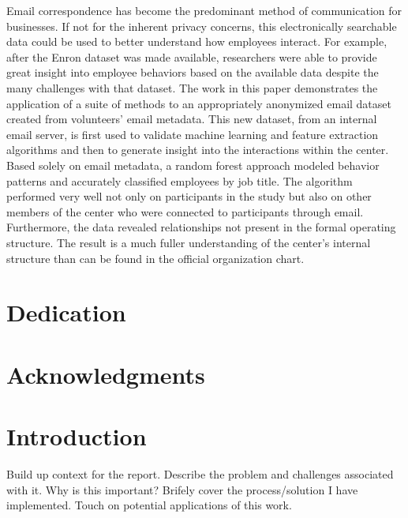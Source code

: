 \documentclass[12pt,dvips]{report}
\begin{document}
Email correspondence has become the predominant method of communication for businesses.  
If not for the inherent privacy concerns, this electronically searchable data could be used to better understand how employees interact. 
For example, after the Enron dataset was made available, researchers were able to provide great insight into employee behaviors based on the available data despite the many challenges with that dataset.  
The work in this paper demonstrates the application of a suite of methods to an appropriately anonymized email dataset created from volunteers' email metadata.  
This new dataset, from an internal email server, is first used to validate machine learning and feature extraction algorithms and then to generate insight into the interactions within the center.  
Based solely on email metadata, a random forest approach modeled behavior patterns and accurately classified employees by job title.  
The algorithm performed very well not only on participants in the study but also on other members of the center who were connected to participants through email. 
Furthermore, the data revealed relationships not present in the formal operating structure. 
The result is a much fuller understanding of the center's internal structure than can be found in the official organization chart.


\vfill



\pagebreak

\chapter*{Dedication}
\chapter*{Acknowledgments}

\tableofcontents
\pagebreak

\listoffigures
\pagebreak

\listoftables
\pagebreak

\pagestyle{myheadings}

\chapter{Introduction}
Build up context for the report.  Describe the problem and challenges associated with it.  Why is this important?  Brifely cover the process/solution I have implemented.  Touch on potential applications of this work.
\end{document}
